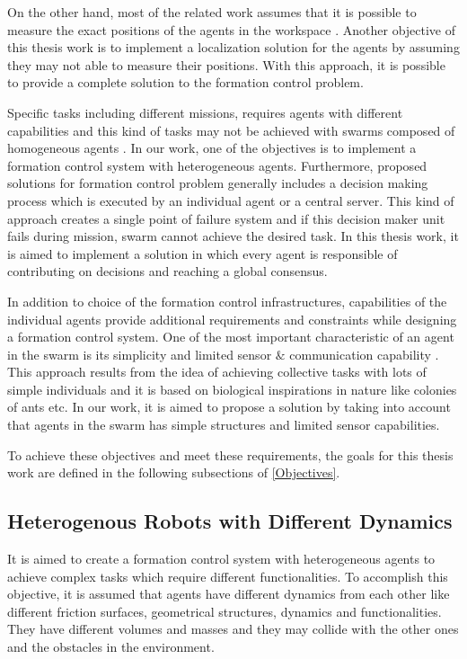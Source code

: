On the other hand, most of the related work assumes that it is possible to measure the exact positions of the agents in the workspace \cite{98,97}. Another objective of this thesis work is to implement a localization solution for the agents by assuming they may not able to measure their positions. With this approach, it is possible to provide a complete solution to the formation control problem.

Specific tasks including different missions, requires agents with different capabilities and this kind of tasks may not be achieved with swarms composed of homogeneous agents \cite{99}. In our work, one of the objectives is to implement a formation control system with heterogeneous agents. Furthermore, proposed solutions for formation control problem generally includes a decision making process which is executed by an individual agent or a central server. This kind of approach creates a single point of failure system and if this decision maker unit fails during mission, swarm cannot achieve the desired task. In this thesis work, it is aimed to implement a solution in which every agent is responsible of contributing on decisions and reaching a global consensus. 

In addition to choice of the formation control infrastructures, capabilities of the individual agents provide additional requirements and constraints while designing a formation control system. One of the most important characteristic of an agent in the swarm is its simplicity and limited sensor $\&$ communication capability \cite{6}. This approach results from the idea of achieving collective tasks with lots of simple individuals  and it is based on biological inspirations in nature like colonies of ants etc. In our work, it is aimed to propose a solution by taking into account that agents in the swarm has simple structures and limited sensor capabilities.

To achieve these objectives and meet these requirements, the goals for this thesis work are defined in the following subsections of \ref{Objectives}.

\subsection{Heterogenous Robots with Different Dynamics}
It is aimed to create a formation control system with heterogeneous agents to achieve complex tasks which require different functionalities. To accomplish this objective, it is assumed that agents have different dynamics from each other like different friction surfaces, geometrical structures, dynamics and functionalities. They have different volumes and masses and they may collide with the other ones and the obstacles in the environment.


